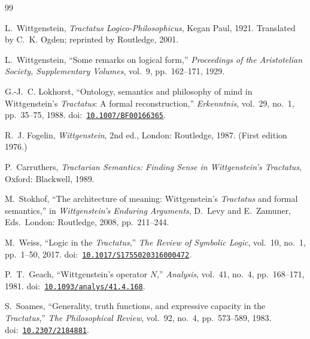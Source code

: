 \documentclass[jsl,bibother]{asl}
\theoremstyle{definition}
\theoremstyle{remark}
\begin{document}

\begin{thebibliography}{99}

L.~Wittgenstein,
\emph{Tractatus Logico-Philosophicus},
Kegan Paul, 1921.
Translated by C.~K. Ogden; reprinted by Routledge, 2001.

L.~Wittgenstein,
``Some remarks on logical form,''
\emph{Proceedings of the Aristotelian Society, Supplementary
Volumes}, vol.~9, pp.~162--171, 1929.

G.-J.~C. Lokhorst,
``Ontology, semantics and philosophy of mind in Wittgenstein's
\emph{Tractatus}: A formal reconstruction,''
\emph{Erkenntnis}, vol.~29, no.~1, pp.~35--75, 1988.
\newline doi:~\href{https://doi.org/10.1007/BF00166365}{\texttt{10.1007/BF00166365}}.

R.~J. Fogelin,
\emph{Wittgenstein}, 2nd ed.,
London: Routledge, 1987.
(First edition 1976.)

P.~Carruthers,
\emph{Tractarian Semantics: Finding Sense in Wittgenstein's
\emph{Tractatus}},
Oxford: Blackwell, 1989.

M.~Stokhof,
``The architecture of meaning: Wittgenstein's \emph{Tractatus} and
formal semantics,''
in \emph{Wittgenstein's Enduring Arguments},
D.~Levy and E.~Zamuner, Eds.\
London: Routledge, 2008, pp.~211--244.

M.~Weiss,
``Logic in the \emph{Tractatus},''
\emph{The Review of Symbolic Logic}, vol.~10, no.~1,
pp.~1--50, 2017.
\newline doi:~\href{https://doi.org/10.1017/S1755020316000472}{\texttt{10.1017/S1755020316000472}}.

P.~T.~Geach,
``Wittgenstein's operator $N$,''
\emph{Analysis}, vol.~41, no.~4, pp.~168--171, 1981.
\newline doi:~\href{https://doi.org/10.1093/analys/41.4.168}{\texttt{10.1093/analys/41.4.168}}.

S.~Soames,
``Generality, truth functions, and expressive capacity in the
\emph{Tractatus},''
\emph{The Philosophical Review}, vol.~92, no.~4, pp.~573--589, 1983.
\newline doi:~\href{https://doi.org/10.2307/2184881}{\texttt{10.2307/2184881}}.


\end{thebibliography}
\end{document}
